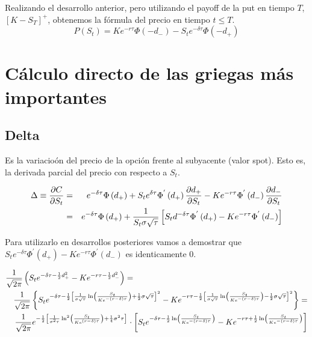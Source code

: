 \documentclass[12pt]{article}
\begin{document}
Realizando el desarrollo anterior, pero utilizando el payoff de la put en tiempo $T$, $\left[K-S_{T}\right]^{+}$, obtenemos
la f\'{o}rmula del precio en tiempo $t\leq T$.
\newline
\begin{equation}
	P\left(S_{t}\right) = Ke^{-r\tau}\Phi\left(-d_{-}\right) - S_{t}e^{-\delta\tau}\Phi\left(-d_{+}\right)
\end{equation}
\newline

\section{C\'{a}lculo directo de las griegas m\'{a}s importantes}
\subsection{Delta}

Es la variacio\'{o}n del precio de la opci\'{o}n frente al subyacente (valor spot). Esto es, la derivada parcial del precio con respecto a 
$S_{t}$.
\newline

\begin{eqnarray}
	\Delta\equiv\frac{\partial C}{\partial S_{t}} & = & e^{-\delta\tau}\Phi\left(d_{+}\right) + 
								S_{t}e^{\-\delta\tau}\Phi^{'}\left(d_{+}\right)
								\frac{\partial d_{+}}{\partial S_{t}} - Ke^{-r\tau}
								\Phi^{'}\left(d_{-}\right)\frac{\partial d_{-}}{\partial S_{t}} 
								\nonumber \\
					& = & e^{-\delta\tau}\Phi\left(d_{+}\right) + 
						\frac{1}{S_{t}\sigma\sqrt{\tau}}\left[S_{t}d^{-\delta\tau}
						\Phi^{'}\left(d_{+}\right)-Ke^{-r\tau}\Phi^{'}\left(d_{-}\right)\right] 
								\nonumber 
\end{eqnarray}
\newline

Para utilizarlo en desarrollos posteriores vamos a demostrar que $S_{t}e^{-\delta\tau}\Phi^{'}\left(d_{+}\right) - 
Ke^{-r\tau}\Phi^{'}\left(d_{-}\right)$ es identicamente $0$.
\newline

\begin{eqnarray*}
	\lefteqn{\frac{1}{\sqrt{2\pi}}\left(S_{t}e^{-\delta\tau-\frac{1}{2}d_{+}^{2}}-Ke^{-r\tau-\frac{1}{2}d_{-}^{2}}\right) =} \\
	  &  & \frac{1}{\sqrt{2\pi}}\left\{ S_{t}e^{-\delta\tau-\frac{1}{2}\left[\frac{1}{\sigma\sqrt{\tau}}\ln\left(\frac{S_{t}} 
	{Ke^{-\left(r-\delta\right)\tau}}\right)+\frac{1}{2}\sigma\sqrt{\tau}\right]^{2}} - 
	 Ke^{-r\tau-\frac{1}{2}\left[\frac{1}{\sigma\sqrt{\tau}}\ln\left(\frac{S_{t}}{Ke^{-\left(r-\delta\right)\tau}}
	\right)-\frac{1}{2}\sigma\sqrt{\tau}\right]^{2}}\right\} = \\
	  &  & \frac{1}{\sqrt{2\pi}}e^{-\frac{1}{2}\left[\frac{1}{\sigma^{2}\tau}\ln^{2}\left(\frac{S_{t}}{Ke^{\left(r-\delta\right)
	\tau}}\right) + \frac{1}{4}\sigma^{2}\tau\right]}\cdot\left[S_{t}e^{-\delta\tau-\frac{1}{2}\ln\left(\frac{S_{t}}
	{Ke^{-\left(r-\delta\right)\tau}}\right)}-
	Ke^{-r\tau+\frac{1}{2}\ln\left(\frac{S_{t}}{Ke^{-\left(r-\delta\right)\tau}}\right)}\right]
\end{eqnarray*}
\end{document}

